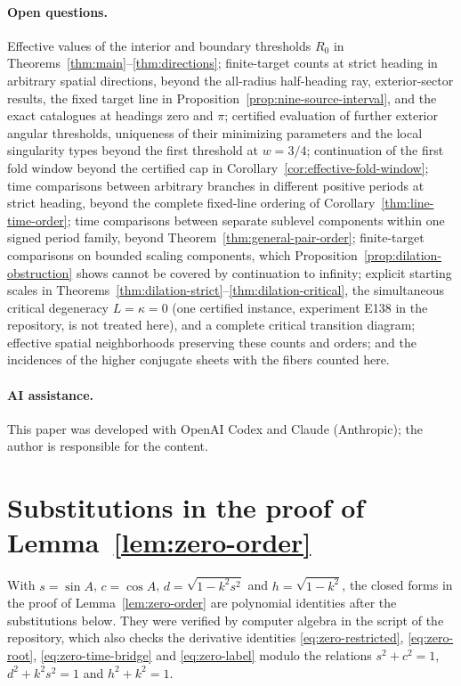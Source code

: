 \documentclass[11pt,a4paper]{article}
\theoremstyle{remark}\newtheorem{remark}[theorem]{Remark}
\begin{document}
\paragraph{Open questions.}
Effective values of the interior and boundary thresholds $R_0$ in
Theorems~\ref{thm:main}--\ref{thm:directions}; finite-target counts at
strict heading in arbitrary spatial directions, beyond the all-radius
half-heading ray, exterior-sector results, the fixed target line in
Proposition~\ref{prop:nine-source-interval}, and the exact catalogues
at headings zero and $\pi$; certified evaluation of further exterior
angular thresholds, uniqueness of their minimizing parameters and the
local singularity types beyond the first threshold at $w=3/4$; continuation of
the first fold window beyond the certified cap in
Corollary~\ref{cor:effective-fold-window}; time comparisons between
arbitrary branches in different positive periods at strict heading, beyond
the complete fixed-line ordering of Corollary~\ref{thm:line-time-order};
time comparisons between separate sublevel components within one signed
period family, beyond Theorem~\ref{thm:general-pair-order};
finite-target comparisons on bounded scaling components, which
Proposition~\ref{prop:dilation-obstruction} shows cannot be covered by
continuation to infinity; explicit starting scales in
Theorems~\ref{thm:dilation-strict}--\ref{thm:dilation-critical}, the
simultaneous critical degeneracy $L=\kappa=0$ (one certified instance,
experiment E138 in the repository, is not treated here), and a complete critical
transition diagram;
effective spatial neighborhoods preserving these counts and orders;
and the incidences of the higher conjugate
sheets \cite{CT} with the fibers counted here.

\paragraph{AI assistance.}
This paper was developed with OpenAI Codex and Claude (Anthropic); the
author is responsible for the content.

\appendix
\section{Substitutions in the proof of Lemma~\ref{lem:zero-order}}
\label{app:subs}

With $s=\sin A$, $c=\cos A$, $d=\sqrt{1-k^2s^2}$ and $h=\sqrt{1-k^2}$,
the closed forms in the proof of Lemma~\ref{lem:zero-order} are
polynomial identities after the substitutions below. They were verified
by computer algebra in the script
 of the repository, which also
checks the derivative identities \eqref{eq:zero-restricted},
\eqref{eq:zero-root}, \eqref{eq:zero-time-bridge} and
\eqref{eq:zero-label} modulo the relations $s^2+c^2=1$, $d^2+k^2s^2=1$
and $h^2+k^2=1$.
\end{document}
